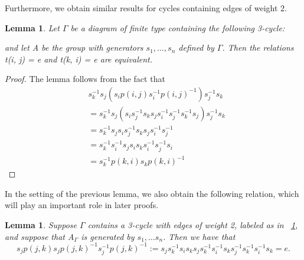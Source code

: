 \documentclass[11pt]{amsart}
\newtheorem{lem}[thm]{Lemma}
\theoremstyle{definition}
\begin{document}
Furthermore, we obtain similar results for cycles containing edges of weight 2.
\begin{lem} \label{2tri}
Let $\Gamma$ be a diagram of finite type containing the following 3-cycle:

and let A be the group with generators $s_{1}, \dots, s_{n}$ defined by $\Gamma$. Then the relations t(i, j) = e and t(k, i) = e are equivalent.
\end{lem}

\begin{proof}
The lemma follows from the fact that
\begin{align*}
& s_{k}^{-1}s_{j}(s_{i}p(i, j)s_{i}^{-1}p(i, j)^{-1})s_{j}^{-1}s_{k} \\
&= s_{k}^{-1}s_{j}(s_{i}s_{j}^{-1}s_{k}s_{j}s_{i}^{-1}s_{j}^{-1}s_{k}^{-1}s_{j})s_{j}^{-1}s_{k} \\
&= s_{k}^{-1}s_{j}s_{i}s_{j}^{-1}s_{k}s_{j}s_{i}^{-1}s_{j}^{-1} \\
&= s_{k}^{-1}s_{i}^{-1}s_{j}s_{i}s_{k}s_{i}^{-1}s_{j}^{-1}s_{i} \\
&= s_{k}^{-1}p(k, i)s_{k}p(k, i)^{-1}
\end{align*}
\end{proof}

In the setting of the previous lemma, we also obtain the following relation, which will play an important role in later proofs.

\begin{lem}\label{lem:extra_square_relation}
Suppose $\Gamma$ contains a 3-cycle with edges of weight 2, labeled as in ~\ref{2tri}, and suppose that A$_{\Gamma}$ is generated by $s_{1}, \dots s_{n}$. Then we have that
$$s_{j}p(j, k)s_{j}p(j, k)^{-1}s_{j}^{-1}p(j, k)^{-1} := s_{j}s_{k}^{-1}s_{i}s_{k}s_{j}s_{k}^{-1}s_{i}^{-1}s_{k}s_{j}^{-1}s_{k}^{-1}s_{i}^{-1}s_{k} = e.$$
\end{lem}
\end{document}
